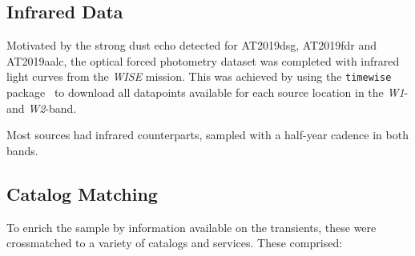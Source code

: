 \subsection{Infrared Data}
Motivated by the strong dust echo detected for AT2019dsg, AT2019fdr and AT2019aalc, the optical forced photometry dataset was completed with infrared light curves from the \textit{WISE} mission. This was achieved by using the \texttt{timewise} package~ to download all datapoints available for each source location in the \textit{W1}- and \textit{W2}-band.

Most sources had infrared counterparts, sampled with a half-year cadence in both bands.

\subsection{Catalog Matching}
To enrich the sample by information available on the transients, these were crossmatched to a variety of catalogs and services. These comprised:

